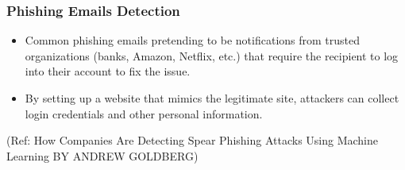 


\begin{frame}[fragile]\frametitle{ Phishing Emails Detection}
\begin{itemize}
\item  Common phishing emails pretending to be notifications from trusted organizations (banks, Amazon, Netflix, etc.) that require the recipient to log into their account to fix the issue. 
\item By setting up a website that mimics the legitimate site, attackers can collect login credentials and other personal information.
\end{itemize}

\tiny{(Ref: How Companies Are Detecting Spear Phishing Attacks Using Machine Learning BY ANDREW GOLDBERG)}
\end{frame}



